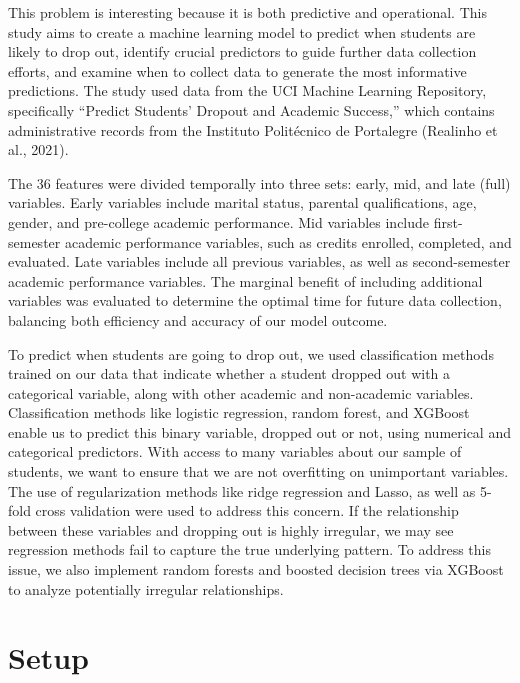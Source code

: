 \documentclass[11pt]{article}
\begin{document}
This problem is interesting because it is both predictive and operational. This study aims to create a machine learning model to predict when students are likely to drop out, identify crucial predictors to guide further data collection efforts, and examine when to collect data to generate the most informative predictions. The study used data from the UCI Machine Learning Repository, specifically ``Predict Students' Dropout and Academic Success,'' which contains administrative records from the Instituto Politécnico de Portalegre (Realinho et al., 2021).

The 36 features were divided temporally into three sets: early, mid, and late (full) variables. Early variables include marital status, parental qualifications, age, gender, and pre-college academic performance. Mid variables include first-semester academic performance variables, such as credits enrolled, completed, and evaluated. Late variables include all previous variables, as well as second-semester academic performance variables. The marginal benefit of including additional variables was evaluated to determine the optimal time for future data collection, balancing both efficiency and accuracy of our model outcome.

To predict when students are going to drop out, we used classification methods trained on our data that indicate whether a student dropped out with a categorical variable, along with other academic and non-academic variables. Classification methods like logistic regression, random forest, and XGBoost enable us to predict this binary variable, dropped out or not, using numerical and categorical predictors. With access to many variables about our sample of students, we want to ensure that we are not overfitting on unimportant variables. The use of regularization methods like ridge regression and Lasso, as well as 5-fold cross validation were used to address this concern. If the relationship between these variables and dropping out is highly irregular, we may see regression methods fail to capture the true underlying pattern. To address this issue, we also implement random forests and boosted decision trees via XGBoost to analyze potentially irregular relationships.

\section{Setup}
\end{document}
